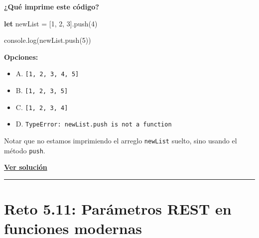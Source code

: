 \documentclass[
  letterpaper,
  DIV=11,
  numbers=noendperiod]{scrreprt}
\newenvironment{Shaded}{\begin{snugshade}}{\end{snugshade}}
\newcommand{\BuiltInTok}[1]{\textcolor[rgb]{0.00,0.23,0.31}{#1}}
\newcommand{\DecValTok}[1]{\textcolor[rgb]{0.68,0.00,0.00}{#1}}
\newcommand{\FunctionTok}[1]{\textcolor[rgb]{0.28,0.35,0.67}{#1}}
\newcommand{\KeywordTok}[1]{\textcolor[rgb]{0.00,0.23,0.31}{\textbf{#1}}}
\newcommand{\NormalTok}[1]{\textcolor[rgb]{0.00,0.23,0.31}{#1}}
\newcommand{\OperatorTok}[1]{\textcolor[rgb]{0.37,0.37,0.37}{#1}}
\providecommand{\tightlist}{%
  \setlength{\itemsep}{0pt}\setlength{\parskip}{0pt}}
\begin{document}
\textbf{¿Qué imprime este código?}

\begin{Shaded}
\begin{Highlighting}[]
\KeywordTok{let}\NormalTok{ newList }\OperatorTok{=}\NormalTok{ [}\DecValTok{1}\OperatorTok{,} \DecValTok{2}\OperatorTok{,} \DecValTok{3}\NormalTok{]}\OperatorTok{.}\FunctionTok{push}\NormalTok{(}\DecValTok{4}\NormalTok{)}

\BuiltInTok{console}\OperatorTok{.}\FunctionTok{log}\NormalTok{(newList}\OperatorTok{.}\FunctionTok{push}\NormalTok{(}\DecValTok{5}\NormalTok{))}
\end{Highlighting}
\end{Shaded}

\textbf{Opciones:}

\begin{itemize}
\tightlist
\item
  A. \texttt{{[}1,\ 2,\ 3,\ 4,\ 5{]}}
\item
  B. \texttt{{[}1,\ 2,\ 3,\ 5{]}}
\item
  C. \texttt{{[}1,\ 2,\ 3,\ 4{]}}
\item
  D. \texttt{TypeError:\ newList.push\ is\ not\ a\ function}
\end{itemize}

\begin{tcolorbox}[enhanced jigsaw, left=2mm, toprule=.15mm, leftrule=.75mm, breakable, colback=white, coltitle=black, bottomtitle=1mm, arc=.35mm, rightrule=.15mm, colframe=quarto-callout-tip-color-frame, opacitybacktitle=0.6, toptitle=1mm, opacityback=0, titlerule=0mm, title=\textcolor{quarto-callout-tip-color}{\faLightbulb}\hspace{0.5em}{Pista}, bottomrule=.15mm, colbacktitle=quarto-callout-tip-color!10!white]

Notar que no estamos imprimiendo el arreglo \texttt{newList} suelto,
sino usando el método \texttt{push}.

\end{tcolorbox}

\textbf{\hyperref[sec-sol-cap5-reto10]{Ver solución}}

\begin{center}\rule{0.5\linewidth}{0.5pt}\end{center}

\section{Reto 5.11: Parámetros REST en funciones
modernas}\label{sec-cap5-reto11}
\end{document}
